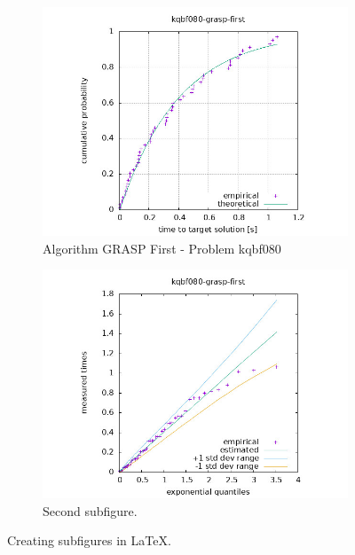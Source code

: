 \begin{figure}[H]
    \centering
    \begin{subfigure}{0.49\textwidth}
        \includegraphics[width=\textwidth]{figure/ttt_plot/kqbf080-grasp-first-exp.jpeg}
        \caption{Algorithm GRASP First - Problem kqbf080}
        \label{fig:grasp-first-kqbf080-exp}
    \end{subfigure}
    \hfill
    \begin{subfigure}{0.49\textwidth}
        \includegraphics[width=\textwidth]{figure/ttt_plot/kqbf080-grasp-first-qq.jpeg}
        \caption{Second subfigure.}
        \label{fig:grasp-first-kqbf080-qq}
    \end{subfigure}
    \caption{Creating subfigures in \LaTeX.}
    \label{fig:grasp-first-kqbf080}
\end{figure}


